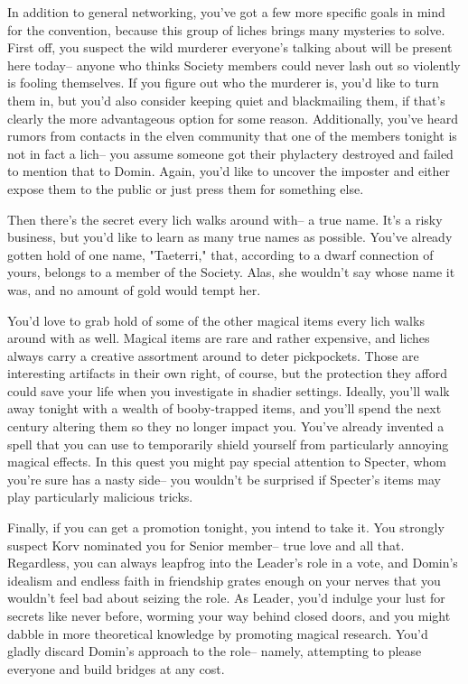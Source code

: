 \documentclass[char]{Sel}
\begin{document}
In addition to general networking, you've got a few more specific goals in mind for the convention, because this group of liches brings many mysteries to solve. First off, you suspect the wild murderer everyone's talking about will be present here today-- anyone who thinks Society members could never lash out so violently is fooling themselves. If you figure out who the murderer is, you'd like to turn them in, but you'd also consider keeping quiet and blackmailing them, if that's clearly the more advantageous option for some reason. Additionally, you've heard rumors from contacts in the elven community that one of the members tonight is not in fact a lich-- you assume someone got their phylactery destroyed and failed to mention that to Domin. Again, you'd like to uncover the imposter and either expose them to the public or just press them for something else.

Then there's the secret every lich walks around with-- a true name. It's a risky business, but you'd like to learn as many true names as possible. You've already gotten hold of one name, "Taeterri," that, according to a dwarf connection of yours, belongs to a member of the Society. Alas, she wouldn't say whose name it was, and no amount of gold would tempt her.

You'd love to grab hold of some of the other magical items every lich walks around with as well. Magical items are rare and rather expensive, and liches always carry a creative assortment around to deter pickpockets. Those are interesting artifacts in their own right, of course, but the protection they afford could save your life when you investigate in shadier settings. Ideally, you'll walk away tonight with a wealth of booby-trapped items, and you'll spend the next century altering them so they no longer impact you. You've already invented a spell that you can use to temporarily shield yourself from particularly annoying magical effects. In this quest you might pay special attention to Specter, whom you're sure has a nasty side-- you wouldn't be surprised if Specter's items may play particularly malicious tricks.

Finally, if you can get a promotion tonight, you intend to take it. You strongly suspect Korv nominated you for Senior member-- true love and all that. Regardless, you can always leapfrog into the Leader's role in a vote, and Domin's idealism and endless faith in friendship grates enough on your nerves that you wouldn't feel bad about seizing the role. As Leader, you'd indulge your lust for secrets like never before, worming your way behind closed doors, and you might dabble in more theoretical knowledge by promoting magical research. You'd gladly discard Domin's approach to the role-- namely, attempting to please everyone and build bridges at any cost.
\end{document}
